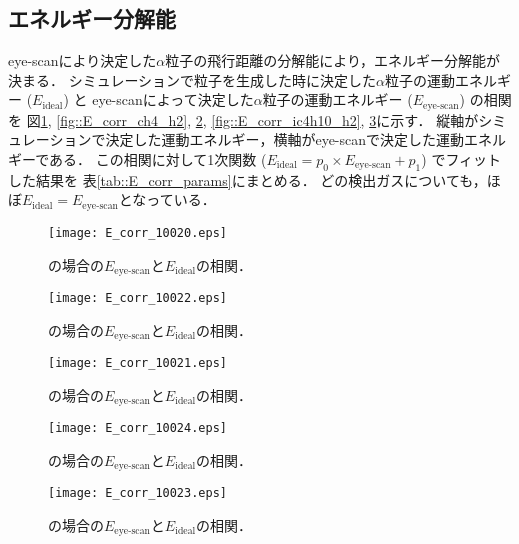 \documentclass[../master]{subfiles}
\begin{document}
\subsection{エネルギー分解能}
eye-scanにより決定した$\alpha$粒子の飛行距離の分解能により，エネルギー分解能が決まる．
シミュレーションで粒子を生成した時に決定した$\alpha$粒子の運動エネルギー ($E_{\text{ideal}}$) と
eye-scanによって決定した$\alpha$粒子の運動エネルギー ($E_{\text{eye-scan}}$) の相関を
図\ref{fig::E_corr_ch4}, \ref{fig::E_corr_ch4_h2}, \ref{fig::E_corr_ch4_he},
\ref{fig::E_corr_ic4h10_h2}, \ref{fig::E_corr_ic4h10_he}に示す．
縦軸がシミュレーションで決定した運動エネルギー，横軸がeye-scanで決定した運動エネルギーである．
この相関に対して1次関数 ($E_{\text{ideal}} = p_0\times E_{\text{eye-scan}}+p_1$) でフィットした結果を
表\ref{tab::E_corr_params}にまとめる．
どの検出ガスについても，ほぼ$E_{\text{ideal}} = E_{\text{eye-scan}}$となっている．
\begin{figure}
  \centering
  \begin{minipage}{0.45\columnwidth}
    \centering
    \texttt{[image: E\_corr\_10020.eps]}
    \caption{\Methane の場合の$E_{\text{eye-scan}}$と$E_{\text{ideal}}$の相関．}
    \label{fig::E_corr_ch4}
  \end{minipage}  
\end{figure}
\begin{figure}
  \centering
  \begin{minipage}{0.45\columnwidth}
    \centering
    \texttt{[image: E\_corr\_10022.eps]}
    \caption{\MethaneHydro の場合の$E_{\text{eye-scan}}$と$E_{\text{ideal}}$の相関．}
    \label{fig::E_corr_ch4_h2}
  \end{minipage}
  \begin{minipage}{0.45\columnwidth}
    \centering
    \texttt{[image: E\_corr\_10021.eps]}
    \caption{\MethaneHerium の場合の$E_{\text{eye-scan}}$と$E_{\text{ideal}}$の相関．}
    \label{fig::E_corr_ch4_he}
  \end{minipage}
\end{figure}
\begin{figure}
  \centering
  \begin{minipage}{0.45\columnwidth}
    \centering
    \texttt{[image: E\_corr\_10024.eps]}
    \caption{\isoButaneHydro の場合の$E_{\text{eye-scan}}$と$E_{\text{ideal}}$の相関．}
    \label{fig::E_corr_ic4h10_h2}
  \end{minipage}
  \begin{minipage}{0.45\columnwidth}
    \centering
    \texttt{[image: E\_corr\_10023.eps]}
    \caption{\isoButaneHerium の場合の$E_{\text{eye-scan}}$と$E_{\text{ideal}}$の相関．}
    \label{fig::E_corr_ic4h10_he}
  \end{minipage}
\end{figure}
\end{document}
